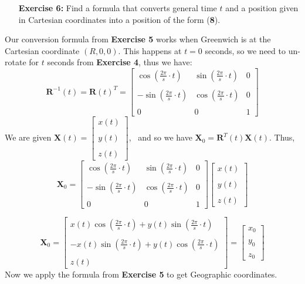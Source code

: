 \documentclass[11pt]{article}
\theoremstyle{definition}
\newcommand{\1}[1]{\mathbf{1} \left \{ #1 \right \}}
\begin{document}
\begin{itemize}
\item[{\textbf{Exercise 6:}}] Find a formula that converts general time $t$ and a position given in Cartesian coordinates into a position of the form (\textbf{8}).
\end{itemize}
Our conversion formula from \textbf{Exercise 5} works when Greenwich is at the Cartesian coordinate $(R,0,0)$.  This happens at $t=0$ seconds, so we need to un-rotate for $t$ seconds from \textbf{Exercise 4}, thus we have:
\[\textbf{R}^{-1}(t) = \textbf{R}(t)^T = \begin{bmatrix}
\cos \left(\frac{2\pi}{s} \cdot t\right) & \sin \left(\frac{2\pi}{s} \cdot t\right) & 0 \\ \\
-\sin \left(\frac{2\pi}{s} \cdot t\right) & \cos \left(\frac{2\pi}{s} \cdot t\right) & 0 \\ \\
0 & 0 & 1 \end{bmatrix}\]
We are given \(\textbf{X}(t) = \begin{bmatrix}
x(t) \\ \\ y(t) \\ \\ z(t) \end{bmatrix}\), \ and so we have \(\textbf{X}_0 = \textbf{R}^T(t) \textbf{X}(t)\).  Thus,
\[\textbf{X}_0 = \begin{bmatrix}
\cos \left(\frac{2\pi}{s} \cdot t\right) & \sin \left(\frac{2\pi}{s} \cdot t\right) & 0 \\ \\
-\sin \left(\frac{2\pi}{s} \cdot t\right) & \cos \left(\frac{2\pi}{s} \cdot t\right) & 0 \\ \\
0 & 0 & 1 \end{bmatrix}
\begin{bmatrix} x(t) \\ \\ y(t) \\ \\ z(t) \end{bmatrix}\]

\[\textbf{X}_0 = \begin{bmatrix}
x(t)\cos \left(\frac{2\pi}{s} \cdot t\right) + y(t)\sin \left(\frac{2\pi}{s} \cdot t\right) \\ \\
-x(t)\sin \left(\frac{2\pi}{s} \cdot t\right) + y(t)\cos \left(\frac{2\pi}{s} \cdot t\right) \\ \\
z(t)
\end{bmatrix}
= \begin{bmatrix} x_0 \\ \\ y_0 \\ \\ z_0 \end{bmatrix}\]
Now we apply the formula from \textbf{Exercise 5} to get Geographic coordinates.
\end{document}

